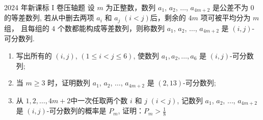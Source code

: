 \documentclass[noamssymb]{ctexbeamer}
\begin{document}
\begin{frame}{2024 年新课标 I 卷压轴题}
  设 $m$ 为正整数，数列 $a_1$, $a_2$, $\ldots$, $a_{4m+2}$ 是公差不为 $0$ 的等差数列,
  若从中删去两项 $a_i$ 和 $a_j$ $(i < j)$后，剩余的 $4m$ 项可被平均分为 $m$ 组，
  且每组的 $4$ 个数都能构成等差数列，则称数列 $a_1$, $a_2$, $\ldots$, $a_{4m+2}$
  是 $(i, j)$-可分数列.
  \begin{enumerate}[(1)]
  \item 写出所有的 $(i,j)$, $(1 \leq i < j \leq 6)$,
    使数列 $a_1,a_2,\ldots,a_6$ 是 $(i, j)$-可分数列;
  \item 当 $m \geq 3$ 时，证明数列 $a_1$, $a_2$, $\ldots$, $a_{4m+2}$ 是 $(2, 13)$-可分数列;
  \item 从 $1,2,\ldots, 4m+2$中一次任取两个数 $i$ 和 $j$ $(i < j)$,
    记数列 $a_1$, $a_2$, $\ldots$, $a_{4m+2}$ 是 $(i, j)$-可分数列的概率是 $P_{m}$,
    证明：$P_{m} > \frac{1}{8}$
  \end{enumerate}
\end{frame}
\end{document}
